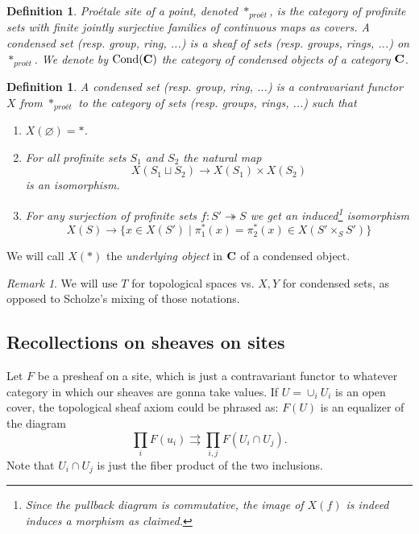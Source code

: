 \documentclass[A4paper, british, reqno]{amsart}
\theoremstyle{darkgreentheorem}
\theoremstyle{darkbluedefinition}
\newtheorem{defn}[thm]{Definition}
\theoremstyle{darkredexample}
\theoremstyle{remark}
\newtheorem{rem}[thm]{Remark}
\DeclareMathOperator{\Cond}{Cond}
\newcommand{\1}{\mathbbm{1}}
\newcommand{\pe}{*_{proét}}
\newcommand{\fp}[1]{\times_{#1}}
\begin{document}
\begin{defn}
    Pro\'{e}tale site of a point, denoted $\pe$, is the category of profinite sets with finite jointly surjective families of continuous maps as covers.
    A \textit{condensed set} (resp. group, ring, ...) is a sheaf of sets (resp. groups, rings, ...) on $\pe$.
    We denote by $\Cond(\bfC)$ the category of condensed objects of a category $\mathbf{C}$.
\end{defn}

\begin{defn}
    A \textit{condensed set} (resp. group, ring, ...) is a contravariant functor $X$ from $\pe$ to the category of sets (resp. groups, rings, ...) such that 
    \begin{enumerate}[label=\roman*)]
	\item $X(\varnothing)=*$.
	\item For all profinite sets $S_{1}$ and $S_{2}$ the natural map
	    \[ X(S_{1}\sqcup S_{2})\to X(S_{1})\times X(S_{2}) \]
	    is an isomorphism.
	\item For any surjection of profinite sets $f\colon S'\twoheadrightarrow S$ we get an induced\footnote{Since the pullback diagram is commutative, the image of $X(f)$ is indeed induces a morphism as claimed.} isomorphism
	    \[ X(S)\to \{ x\in X(S')\mid \pi_{1}^{*}(x)=\pi_{2}^{*}(x)\in X(S'\fp{S}S')\} \]
    \end{enumerate}
\end{defn}

We will call $X(*)$ the \textit{underlying object} in $\mathbf{C}$ of a condensed object.

\begin{rem}
    We will use $T$ for topological spaces vs. $X,Y$ for condensed sets, as opposed to Scholze's mixing of those notations.
\end{rem}

\subsection{Recollections on sheaves on sites}

Let $F$ be a presheaf on a site, which is just a contravariant functor to whatever category in which our sheaves are gonna take values.
If $U=\cup_{i}U_{i}$ is an open cover, the topological sheaf axiom could be phrased as: $F(U)$ is an equalizer of the diagram
\[ \prod_{i}F(u_{i})\rightrightarrows \prod_{i,j}F(U_{i}\cap U_{j}). \]
Note that $U_{i}\cap U_{j}$ is just the fiber product of the two inclusions.
\end{document}
